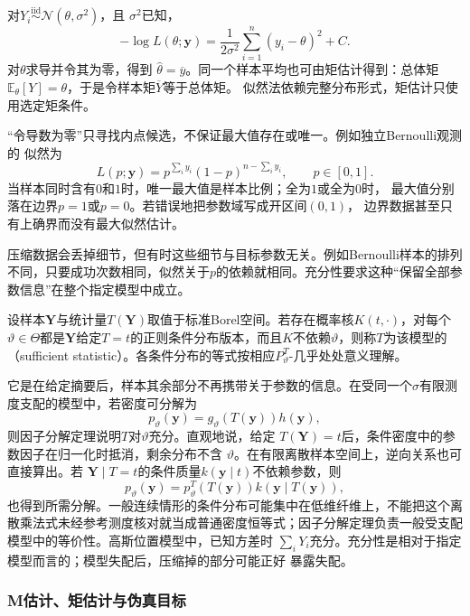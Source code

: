 对\(Y_i\overset{\mathrm{iid}}{\sim}\mathcal{N}(\theta,\sigma^2)\)，且
\(\sigma^2\)已知，
\[
  -\log L(\theta;\bm{y})
  =\frac{1}{2\sigma^2}\sum_{i=1}^n(y_i-\theta)^2+C.
\]
对\(\theta\)求导并令其为零，得到
\(\widehat\theta=\overline y\)。同一个样本平均也可由矩估计得到：总体矩
\(\mathbb{E}_\theta[Y]=\theta\)，于是令样本矩\(\overline Y\)等于总体矩。
似然法依赖完整分布形式，矩估计只使用选定矩条件。

“令导数为零”只寻找内点候选，不保证最大值存在或唯一。例如独立Bernoulli观测的
似然为
\[
  L(p;\bm y)=p^{\sum_i y_i}(1-p)^{n-\sum_i y_i},\qquad p\in[0,1].
\]
当样本同时含有\(0\)和\(1\)时，唯一最大值是样本比例；全为\(1\)或全为\(0\)时，
最大值分别落在边界\(p=1\)或\(p=0\)。若错误地把参数域写成开区间\((0,1)\)，
边界数据甚至只有上确界而没有最大似然估计。

压缩数据会丢掉细节，但有时这些细节与目标参数无关。例如Bernoulli样本的排列不同，只要成功次数相同，似然关于\(p\)的依赖就相同。充分性要求这种“保留全部参数信息”在整个指定模型中成立。
\begin{definition}[充分统计量]
  \label{def:statistics-sufficient-statistic}
  设样本\(\bm Y\)与统计量\(T(\bm Y)\)取值于标准Borel空间。若存在概率核\(K(t,\cdot)\)，对每个\(\vartheta\in\Theta\)都是\(\bm Y\)给定\(T=t\)的正则条件分布版本，而且\(K\)不依赖\(\vartheta\)，则称\(T\)为该模型的（sufficient statistic）。各条件分布的等式按相应\(P_\vartheta^T\)-几乎处处意义理解。
\end{definition}
它是在给定摘要后，样本其余部分不再携带关于参数的信息。在受同一个\(\sigma\)有限测度支配的模型中，若密度可分解为
\[
  p_\vartheta(\bm y)=g_\vartheta(T(\bm y))h(\bm y),
\]
则因子分解定理说明\(T\)对\(\vartheta\)充分。直观地说，给定
\(T(\bm Y)=t\)后，条件密度中的参数因子在归一化时抵消，剩余分布不含
\(\vartheta\)。在有限离散样本空间上，逆向关系也可直接算出。若
\(\bm Y\mid T=t\)的条件质量\(k(\bm y\mid t)\)不依赖参数，则
\[
  p_\vartheta(\bm y)
  =p_\vartheta^T(T(\bm y))k(\bm y\mid T(\bm y)),
\]
也得到所需分解。一般连续情形的条件分布可能集中在低维纤维上，不能把这个离散乘法式未经参考测度核对就当成普通密度恒等式；因子分解定理负责一般受支配模型中的等价性。高斯位置模型中，已知方差时
\(\sum_iY_i\)充分。充分性是相对于指定模型而言的；模型失配后，压缩掉的部分可能正好
暴露失配。

\subsubsection{M估计、矩估计与伪真目标}

